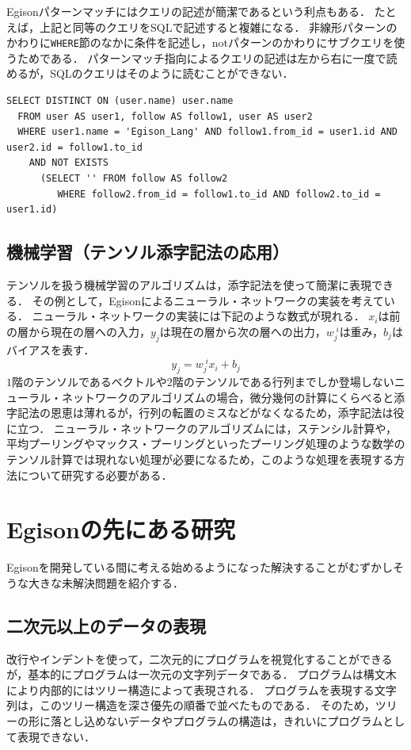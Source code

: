 Egisonパターンマッチにはクエリの記述が簡潔であるという利点もある．
たとえば，上記と同等のクエリをSQLで記述すると複雑になる．
非線形パターンのかわりに\lstinline{WHERE}節のなかに条件を記述し，notパターンのかわりにサブクエリを使うためである．
パターンマッチ指向によるクエリの記述は左から右に一度で読めるが，SQLのクエリはそのように読むことができない．
\begin{lstlisting}[language=egison]
SELECT DISTINCT ON (user.name) user.name
  FROM user AS user1, follow AS follow1, user AS user2
  WHERE user1.name = 'Egison_Lang' AND follow1.from_id = user1.id AND user2.id = follow1.to_id
    AND NOT EXISTS
      (SELECT '' FROM follow AS follow2
         WHERE follow2.from_id = follow1.to_id AND follow2.to_id = user1.id)
\end{lstlisting}

\subsection{機械学習（テンソル添字記法の応用）}

テンソルを扱う機械学習のアルゴリズムは，添字記法を使って簡潔に表現できる．
その例として，Egisonによるニューラル・ネットワークの実装を考えている．
ニューラル・ネットワークの実装には下記のような数式が現れる．
$x_i$は前の層から現在の層への入力，$y_j$は現在の層から次の層への出力，$w^{\;i}_{j}$は重み，$b_j$はバイアスを表す．
\[y_j = w^{\;i}_j x_i + b_j \]
$1$階のテンソルであるベクトルや$2$階のテンソルである行列までしか登場しないニューラル・ネットワークのアルゴリズムの場合，微分幾何の計算にくらべると添字記法の恩恵は薄れるが，行列の転置のミスなどがなくなるため，添字記法は役に立つ．
ニューラル・ネットワークのアルゴリズムには，ステンシル計算や，平均プーリングやマックス・プーリングといったプーリング処理のような数学のテンソル計算では現れない処理が必要になるため，このような処理を表現する方法について研究する必要がある．

\section{Egisonの先にある研究}

Egisonを開発している間に考える始めるようになった解決することがむずかしそうな大きな未解決問題を紹介する．

\subsection{二次元以上のデータの表現}

改行やインデントを使って，二次元的にプログラムを視覚化することができるが，基本的にプログラムは一次元の文字列データである．
プログラムは構文木により内部的にはツリー構造によって表現される．
プログラムを表現する文字列は，このツリー構造を深さ優先の順番で並べたものである．
そのため，ツリーの形に落とし込めないデータやプログラムの構造は，きれいにプログラムとして表現できない．

